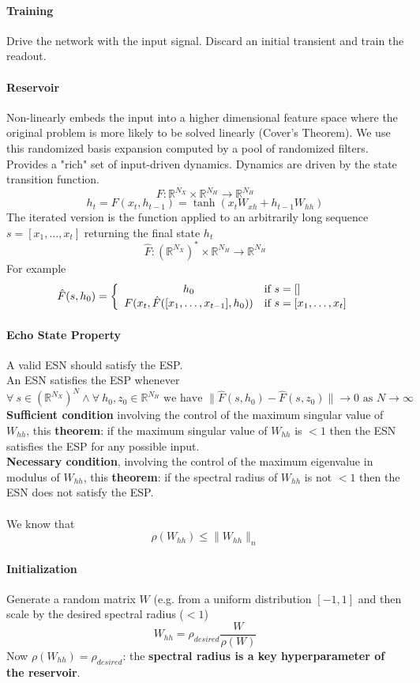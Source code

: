 \documentclass[10pt]{report}
\begin{document}
\paragraph{Training} Drive the network with the input signal. Discard an initial transient and train the readout.
\paragraph{Reservoir} Non-linearly embeds the input into a higher dimensional feature space where the original problem is more likely to be solved linearly (Cover's Theorem). We use this randomized basis expansion computed by a pool of randomized filters. Provides a "rich" set of input-driven dynamics. Dynamics are driven by the state transition function.
$$F:\mathbb{R}^{N_X}\times \mathbb{R}^{N_H}\rightarrow \mathbb{R}^{N_H}$$
$$h_t = F(x_t, h_{t-1}) = \tanh(x_tW_{xh} + h_{t-1}W_{hh})$$
The iterated version is the function applied to an arbitrarily long sequence $s = [x_1,\ldots,x_t]$ returning the final state $h_t$
$$\hat{F}:(\mathbb{R}^{N_X})^*\times \mathbb{R}^{N_H}\rightarrow \mathbb{R}^{N_H}$$
For example $$\hat{F}(s,h_0)=\left\{\begin{array}{c l}
h_0&\text{if }s=[]\\
F(x_t,\hat{F}([x_1,\ldots,x_{t-1}],h_0))&\text{if }s=[x_1,\ldots,x_t]
\end{array}\right.$$
\paragraph{Echo State Property} A valid ESN should satisfy the ESP.\\
An ESN satisfies the ESP whenever
$$\forall\:s\in (\mathbb{R}^{N_X})^N \wedge \forall\:h_0,z_0\in\mathbb{R}^{N_H}\text{ we have }\|\hat{F}(s, h_0)-\hat{F}(s,z_0)\|\rightarrow 0\text{ as }N\rightarrow\infty$$
\textbf{Sufficient condition} involving the control of the maximum singular value of $W_{hh}$, this \textbf{theorem}: if the maximum singular value of $W_{hh}$ is $< 1$ then the ESN satisfies the ESP for any possible input.\\
\textbf{Necessary condition}, involving the control of the maximum eigenvalue in modulus of $W_{hh}$, this \textbf{theorem}: if the spectral radius of $W_{hh}$ is not $< 1$ then the ESN does not satisfy the ESP.\\\\
We know that $$\rho(W_{hh})\leq \|W_{hh}\|_n$$
\paragraph{Initialization} Generate a random matrix $W$ (e.g. from a uniform distribution $[-1,1]$ and then scale by the desired spectral radius ($<1$) $$W_{hh} =\rho_{desired}\frac{W}{\rho(W)}$$
Now $\rho(W_{hh}) = \rho_{desired}$: the \textbf{spectral radius is a key hyperparameter of the reservoir}.
\end{document}
